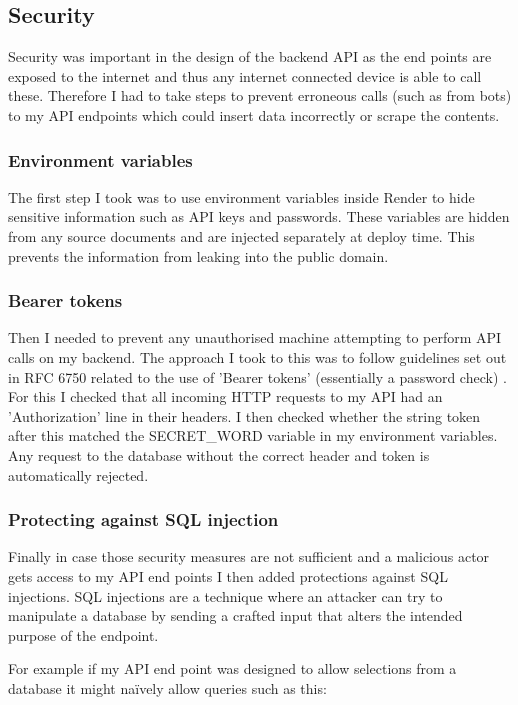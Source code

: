 \subsection{Security}

Security was important in the design of the backend API as the end points are
exposed to the internet and thus any internet connected device is able to call
these. Therefore I had to take steps to prevent erroneous calls (such as from
bots) to my API endpoints which could insert data incorrectly or scrape the
contents.

\subsubsection{Environment variables}
The first step I took was to use environment variables inside Render to hide
sensitive information such as API keys and passwords. These variables are hidden
from any source documents and are injected separately at deploy time. This
prevents the information from leaking into the public domain.

\subsubsection{Bearer tokens}
Then I needed to prevent any unauthorised machine attempting to perform API
calls on my backend. The approach I took to this was to follow guidelines set
out in RFC 6750 related to the use of 'Bearer tokens' (essentially a password
check) \cite{rfc6750}. For this I checked that all incoming HTTP requests to my
API had an 'Authorization' line in their headers. I then checked whether the
string token after this matched the SECRET\_WORD variable in my environment
variables. Any request to the database without the correct header and token is
automatically rejected.

\subsubsection{Protecting against SQL injection}
Finally in case those security measures are not sufficient and a malicious actor
gets access to my API end points I then added protections against SQL
injections. SQL injections are a technique where an attacker can try to
manipulate a database by sending a crafted input that alters the intended
purpose of the endpoint.

For example if my API end point was designed to allow selections from a database
it might naïvely allow queries such as this:

